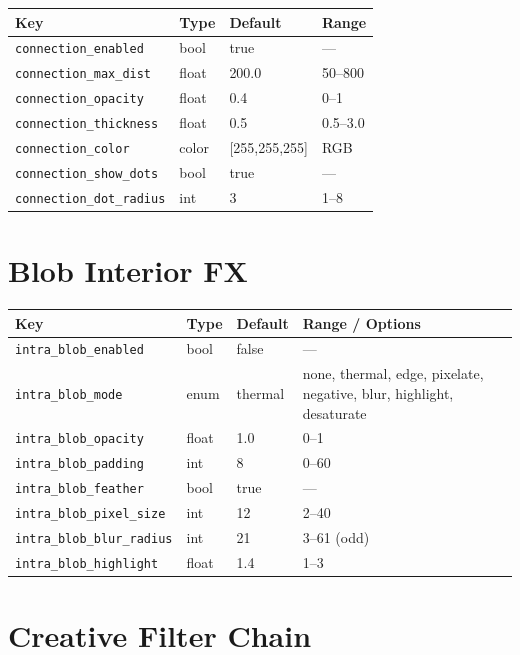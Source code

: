 \documentclass[11pt,a4paper,openany]{report}
\begin{document}
\begin{tabularx}{\linewidth}{@{}lllX@{}}
    \toprule
    \textbf{Key} & \textbf{Type} & \textbf{Default} & \textbf{Range} \\
    \midrule
    \texttt{connection\_enabled}     & bool  & true        & --- \\
    \texttt{connection\_max\_dist}   & float & 200.0       & 50--800 \\
    \texttt{connection\_opacity}     & float & 0.4         & 0--1 \\
    \texttt{connection\_thickness}   & float & 0.5         & 0.5--3.0 \\
    \texttt{connection\_color}       & color & [255,255,255] & RGB \\
    \texttt{connection\_show\_dots}  & bool  & true        & --- \\
    \texttt{connection\_dot\_radius} & int   & 3           & 1--8 \\
    \bottomrule
\end{tabularx}

\section{Blob Interior FX}

\begin{longtable}{@{}llll@{}}
    \toprule
    \textbf{Key} & \textbf{Type} & \textbf{Default} & \textbf{Range / Options} \\
    \midrule
    \endhead
    \texttt{intra\_blob\_enabled}      & bool  & false  & --- \\
    \texttt{intra\_blob\_mode}         & enum  & thermal & none, thermal, edge, pixelate, negative, blur, highlight, desaturate \\
    \texttt{intra\_blob\_opacity}      & float & 1.0    & 0--1 \\
    \texttt{intra\_blob\_padding}      & int   & 8      & 0--60 \\
    \texttt{intra\_blob\_feather}      & bool  & true   & --- \\
    \texttt{intra\_blob\_pixel\_size}  & int   & 12     & 2--40 \\
    \texttt{intra\_blob\_blur\_radius} & int   & 21     & 3--61 (odd) \\
    \texttt{intra\_blob\_highlight}    & float & 1.4    & 1--3 \\
    \bottomrule
\end{longtable}

\section{Creative Filter Chain}
\end{document}
